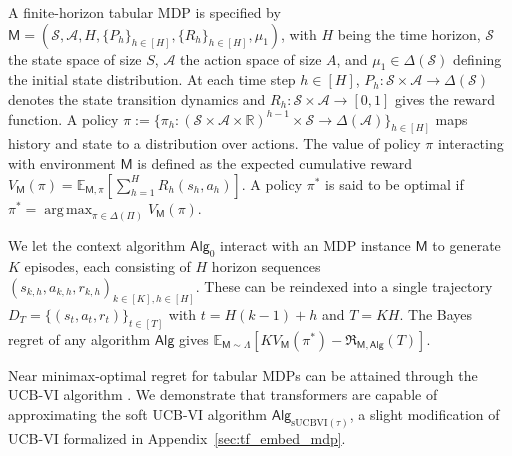\documentclass[10pt]{article}
\DeclareMathOperator*{\argmax}{arg\,max}
\newcommand{\<}{\left\langle}
\renewcommand{\>}{\right\rangle}
\newcommand{\E}{\mathbb{E}}
\newcommand{\R}{\mathbb{R}}
\newcommand{\inst}{{\mathsf{M}}}
\newcommand{\state}{{s}}
\newcommand{\action}{{a}}
\newcommand{\reward}{{r}}
\newcommand{\totlen}{{T}}
\newcommand{\sAlg}{{\mathsf{Alg}}}
\newcommand{\dset}{{D}}
\newcommand{\plc}{{\pi}}
\newcommand{\plcset}{{\Pi}}
\newcommand{\optplc}{{\pi^*}}
\newcommand{\prior}{{\Lambda}}
\newcommand{\Numepi}{{K}}
\newcommand{\horizon}{{H}}
\newcommand{\statesp}{{\mathcal{S}}}
\newcommand{\actionsp}{{\mathcal{A}}}
\renewcommand{\horizon}{{H}}
\newcommand{\transit}{{P}}
\newcommand{\rewardfun}{{R}}
\newcommand{\init}{{\mu_1}}
\newcommand{\valuefun}{{V}}
\newcommand{\totreward}{{\mathfrak{R}}}
\newcommand{\Numst}{{S}}
\newcommand{\Numact}{{A}}
\newcommand{\Vfun}{{\valuefun}}
\newcommand{\sUCBVI}{{\mathrm{sUCBVI}}}
\begin{document}
A finite-horizon tabular MDP is specified by $\inst=(\statesp,\actionsp, \horizon, \{\transit_h\}_{h\in[\horizon]},\{\rewardfun_h\}_{h\in[\horizon]},\init)$, with $\horizon$ being the time horizon, $\statesp$ the state space of size $\Numst$, $\actionsp$ the action space of size $\Numact$, and $\init\in\Delta(\statesp)$ defining the initial state distribution. At each time step $h\in[\horizon]$, $\transit_h: \statesp\times\actionsp \to \Delta(\statesp)$ denotes the state transition dynamics and $\rewardfun_h:\statesp \times \actionsp \to [0,1]$ gives the reward function. A policy $\plc:=\{\plc_h:(\statesp \times\actionsp \times \R)^{h-1}\times\statesp \to\Delta(\actionsp)\}_{h \in [\horizon]}$ maps history and state to a distribution over actions. The value of policy $\pi$ interacting with environment $\inst$ is defined as the expected cumulative reward $\valuefun_\inst(\plc)=\E_{\inst,\plc}[\sum_{h=1}^\horizon \rewardfun_h (\state_h,\action_h)]$. A policy $\optplc$ is said to be optimal if $\optplc=\argmax_{\pi\in\Delta(\plcset)}\valuefun_\inst(\pi)$. 



We let the context algorithm $\sAlg_0$ interact with an MDP instance $\inst$ to generate $\Numepi$ episodes, each consisting of $\horizon$ horizon sequences $ (\state_{k,h},\action_{k,h},\reward_{k,h})_{k \in [\Numepi], h \in [\horizon]}$. These can be reindexed into a single trajectory $\dset_{\totlen} = \{ (\state_t,\action_t,\reward_t) \}_{t \in [\totlen]}$ with $t=H(k-1)+h$ and $\totlen=\Numepi\horizon$. The Bayes regret of any algorithm $\sAlg$ gives $\E_{\inst\sim\prior}[\Numepi\Vfun_\inst(\plc^*)-\totreward_{\inst,\sAlg}(\totlen)]$. 




Near minimax-optimal regret for tabular MDPs can be attained through the UCB-VI algorithm \citep{azar2017minimax}. We demonstrate that transformers are capable of approximating the soft UCB-VI algorithm $\sAlg_{\sUCBVI(\tau)}$, a slight modification of UCB-VI formalized in Appendix~\ref{sec:tf_embed_mdp}. 
\end{document}
